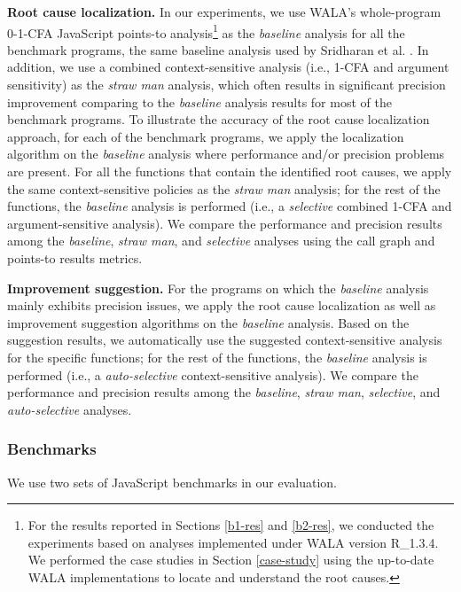 {\bf Root cause localization.} In our experiments, we use WALA's whole-program 0-1-CFA JavaScript points-to analysis\footnote{For the results reported in Sections \ref{b1-res} and \ref{b2-res}, we conducted the experiments based on analyses implemented under WALA version R\_1.3.4. We performed the case studies in Section \ref{case-study} using the up-to-date WALA implementations to locate and understand the root causes.} as the {\it baseline} analysis for all the benchmark programs, the same baseline analysis used by Sridharan et al. \cite{Sridharan:2012:CTP:2367163.2367191}. In addition, we use a combined context-sensitive analysis (i.e., 1-CFA and argument sensitivity) as the {\it straw man} analysis, which often results in significant precision improvement comparing to the {\it baseline} analysis results for most of the benchmark programs. To illustrate the accuracy of the root cause localization approach, for each of the benchmark programs, we apply the localization algorithm on the {\it baseline} analysis where performance and/or precision problems are present. For all the functions that contain the identified root causes, we apply the same context-sensitive policies as the {\it straw man} analysis; for the rest of the functions, the {\it baseline} analysis is performed (i.e., a {\it selective} combined 1-CFA and argument-sensitive analysis).  We compare the performance and precision results among the {\it baseline}, {\it straw man}, and {\it selective} analyses using the call graph and points-to results metrics.

{\bf Improvement suggestion.} For the programs on which the {\it baseline} analysis mainly exhibits precision issues, we apply the root cause localization as well as improvement suggestion algorithms on the {\it baseline} analysis. Based on the suggestion results, we automatically use the suggested context-sensitive analysis for the specific functions; for the rest of the functions, the {\it baseline} analysis is performed (i.e., a {\it auto-selective} context-sensitive analysis). We compare the performance and precision results among the {\it baseline}, {\it straw man}, {\it selective}, and {\it auto-selective} analyses.

\subsubsection{Benchmarks}

We use two sets of JavaScript benchmarks in our evaluation.

